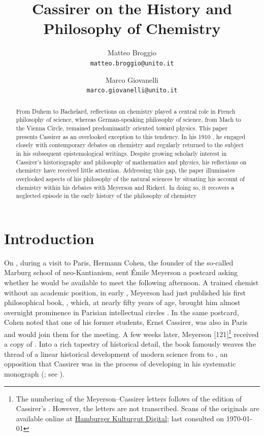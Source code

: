 \documentclass[submitted,12pt]{article}
\title{Cassirer on the History and Philosophy of Chemistry}
\author{\small
Matteo Broggio\\
  \texttt{matteo.broggio@unito.it}
  \and
\small  Marco Giovanelli\\
  \texttt{marco.giovanelli@unito.it}
}
\begin{document}
\maketitle


\begin{abstract}
From Duhem to Bachelard, reflections on chemistry played a central role in French philosophy of science, whereas German-speaking philosophy of science, from Mach to the Vienna Circle, remained predominantly oriented toward physics. This paper presents Cassirer as an overlooked exception to this tendency. In his 1910 \SFt, he engaged closely with contemporary debates on chemistry and regularly returned to the subject in his subsequent epistemological writings. Despite growing scholarly interest in Cassirer’s historiography and philosophy of mathematics and physics, his reflections on chemistry have received little attention. Addressing this gap, the paper illuminates overlooked aspects of his philosophy of the natural sciences by situating his account of chemistry within his debates with Meyerson and Rickert. In doing so, it recovers a neglected episode in the early history of the philosophy of chemistry
\end{abstract}

\section*{Introduction}

On , during a visit to Paris, Hermann Cohen, the founder of the so-called Marburg school of neo-Kantianism, sent Émile Meyerson a postcard asking whether he would be available to meet the following afternoon. A trained chemist without an academic position, in early \citeyear{Meyerson1908}, Meyerson had just published his first philosophical book, \IRt, which, at nearly fifty years of age, brought him almost overnight prominence in Parisian intellectual circles \citep{Laclos2009a}. In the same postcard, Cohen noted that one of his former students, Ernst Cassirer, was also in Paris and would join them for the meeting. A few weeks later, Meyerson [121]\footnote{The numbering of the Meyerson--Cassirer letters follows \cite[]{ECN} of the edition of Cassirer's . However, the letters are not transcribed. Scans of the originals are available online at
\href{https://digitalisate.sub.uni-hamburg.de/recherche?tx_dlf_listview\%5Baction\%5D=main&tx_dlf_listview\%5Bcontroller\%5D=ListView&tx_dlf_listview\%5Bpage\%5D=1&tx_dlf_listview\%5Bsearch\%5D\%5Border\%5D=&tx_dlf_listview\%5Bsearch\%5D\%5BorderBy\%5D=&tx_dlf_listview\%5Bsearch\%5D\%5Bquery\%5D=Meyerson&cHash=0d009ea45cd8a5124ca05a24b99420c9}{Hamburger Kulturgut Digital}; last consulted on \today} received a copy of \EPt \citep{Cassirer1906a,Cassirer1907b}. Into a rich tapestry of historical detail, the book famously weaves the thread of a linear historical development of modern science from \SCs to \FCs, an opposition that Cassirer was in the process of developing in his systematic monograph \SFt (\cite{Cassirer1910}; see \cite{Heis2014a}).
\end{document}
